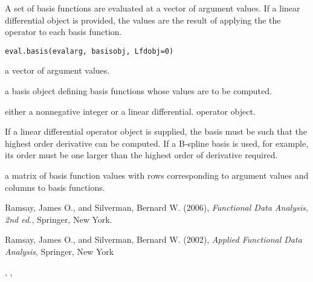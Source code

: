 \begin{Description}\relax
A set of basis functions are evaluated at a vector of argument values.
If a linear differential object is provided, the  values are the
result of applying the the operator to each basis function.
\end{Description}
\begin{Usage}
\begin{verbatim}
eval.basis(evalarg, basisobj, Lfdobj=0)
\end{verbatim}
\end{Usage}
\begin{Arguments}
\begin{ldescription}
\item[\code{evalarg}] a vector of argument values.

\item[\code{basisobj}] a basis object defining basis functions whose values
are to be computed.

\item[\code{Lfdobj}] either a nonnegative integer or a linear differential.
operator object.

\end{ldescription}
\end{Arguments}
\begin{Details}\relax
If a linear differential operator object is supplied, the basis must
be such that the highest order derivative can be computed. If a
B-spline basis is used, for example, its order must be one larger than
the highest order of derivative required.
\end{Details}
\begin{Value}
a matrix of basis function values with rows corresponding
to argument values and columns to basis functions.
\end{Value}
\begin{Source}\relax
Ramsay, James O., and Silverman, Bernard W. (2006), \emph{Functional
Data Analysis, 2nd ed.}, Springer, New York.

Ramsay, James O., and Silverman, Bernard W. (2002), \emph{Applied
Functional Data Analysis}, Springer, New York
\end{Source}
\begin{SeeAlso}\relax
{}, 
, 
\end{SeeAlso}
